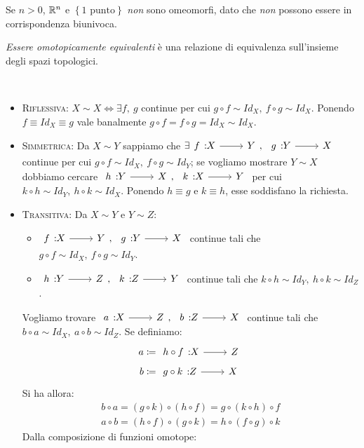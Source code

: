 \begin{attention}
	Se $n>0$, $\mathbb{R}^n$ e $\left\{1\text{ punto}\right\}$ \textit{non} sono omeomorfi, dato che \textit{non} possono essere in corrispondenza biunivoca.
\end{attention}
\begin{exercise}
	\textit{Essere omotopicamente equivalenti} è una relazione di equivalenza sull'insieme degli spazi topologici.
\end{exercise}
\begin{demonstration}~{}
	\begin{itemize}
	\item \textsc{Riflessiva}: $X\sim X\iff \exists f,\ g$ continue per cui $g\circ f\sim Id_X,\ f\circ g\sim Id_X$. Ponendo $f\equiv Id_X\equiv g$ vale banalmente $g\circ f=f\circ g=Id_X\sim Id_X$.
	\item \textsc{Simmetrica}: Da $X\sim Y$ sappiamo che $\exists \funz{f}{X}{Y},\ \funz{g}{Y}{X}$ continue per cui $g\circ f\sim Id_X,\ f\circ g\sim Id_Y$; se vogliamo mostrare $Y\sim X$ dobbiamo cercare $\funz{h}{Y}{X},\ \funz{k}{X}{Y}$ per cui $k\circ h\sim Id_Y,\ h\circ k\sim Id_X$. Ponendo $h\equiv g$ e $k\equiv h$, esse soddisfano la richiesta.
	\item \textsc{Transitiva}: Da $X\sim Y$ e $Y\sim Z$:
	\begin{itemize}
		\item $\funz{f}{X}{Y},\ \funz{g}{Y}{X}$ continue tali che $g\circ f\sim Id_X,\ f\circ g\sim Id_Y$.
			\item $\funz{h}{Y}{Z},\ \funz{k}{Z}{Y}$ continue tali che $k\circ h\sim Id_Y,\ h\circ k\sim Id_Z$.
	\end{itemize}
	Vogliamo trovare $\funz{a}{X}{Z},\ \funz{b}{Z}{X}$ continue tali che $b\circ a\sim Id_X,\ a\circ b\sim Id_Z$. Se definiamo:
	\begin{gather*}
		a\coloneqq \funz{h\circ f}{X}{Z}\\
		b\coloneqq \funz{g\circ k}{Z}{X}
	\end{gather*}
	Si ha allora:
	\begin{gather*}
		b\circ a=\left(g\circ k\right)\circ\left(h\circ f\right)=g\circ \left(k\circ h\right)\circ f\\
		a\circ b=\left(h\circ f\right)\circ \left(g\circ k\right)=h\circ\left(f\circ g\right)\circ k
	\end{gather*}
	Dalla composizione di funzioni omotope:
	\begin{equation*}
		\begin{array}{cccccc}

\end{array}
\end{equation*}
\end{itemize}
\end{demonstration}
